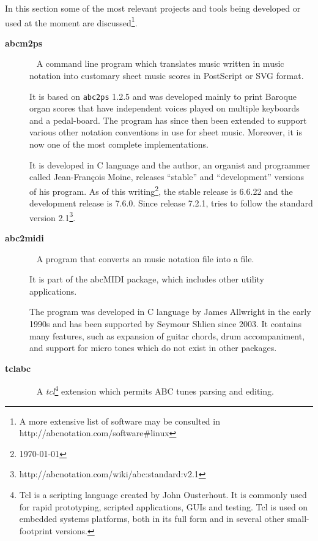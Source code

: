 In this section some of the most relevant projects and tools being developed or used at the moment
are discussed\footnote{A more extensive list of \abc{} software may be consulted in
http://abcnotation.com/software\#linux}.

\begin{description}
  \item[\textbf{abcm2ps}]~\cite{abcm2ps:Online}
    A command line program which translates music written in \abc{} music notation into customary
    sheet music scores in PostScript or SVG format.

    It is based on \texttt{abc2ps} 1.2.5 and was developed mainly to print Baroque organ scores that
    have independent voices played on multiple keyboards and a pedal-board. The  program has since
    then been extended to support various other notation conventions in use for sheet music.
    Moreover, it is now one of the most complete \abc{} implementations.

    It is developed in C language and the author, an organist and programmer called Jean-François
    Moine, releases “stable” and “development” versions of his program. As of this
    writing\footnote{\today}, the stable release is 6.6.22 and the development release is 7.6.0.
    Since release 7.2.1, \abcmtops{} tries to follow the \abc{} standard version
    2.1\footnote{http://abcnotation.com/wiki/abc:standard:v2.1}.

  \item[\textbf{abc2midi}]~\cite{abc2midi:Online}
    A program that converts an \abc{} music notation file into a \midi{} file.

    It is part of the abcMIDI package, which includes other utility applications.

    The program was developed in C language by James Allwright in the early 1990s and has been
    supported by Seymour Shlien since 2003. It contains many features, such as expansion of guitar
    chords, drum accompaniment, and support for micro tones which do not exist in other packages.

  \item[\textbf{tclabc}]~\cite{tclabc:Online}
    A \emph{tcl}\footnote{Tcl is a scripting language created by John Ousterhout. It is commonly
    used for rapid prototyping, scripted applications, GUIs and testing. Tcl is used on embedded
    systems platforms, both in its full form and in several other small-footprint versions.}
    extension which permits ABC tunes parsing and editing.


\end{description}
